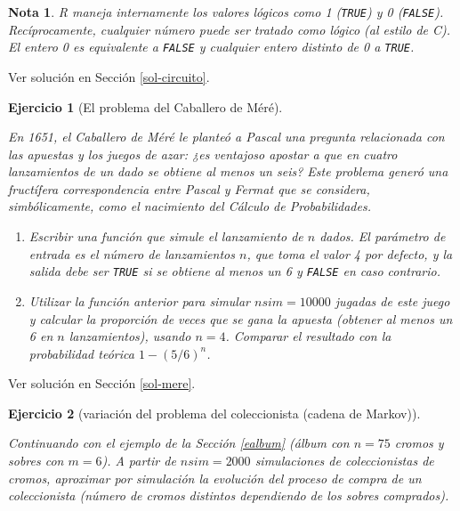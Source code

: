 \documentclass[
]{book}
\theoremstyle{break}
\newtheorem{exercise}{Ejercicio}[chapter]
\theoremstyle{nonumberplain}
\newtheorem{remark}{Nota}
\begin{document}
\begin{remark}
R maneja internamente los valores lógicos como 1 (\texttt{TRUE}) y 0 (\texttt{FALSE}).
Recíprocamente, cualquier número puede ser tratado como lógico (al estilo de C).
El entero 0 es equivalente a \texttt{FALSE} y cualquier entero distinto de 0 a \texttt{TRUE}.
\end{remark}

Ver solución en Sección \ref{sol-circuito}.

\begin{exercise}[El problema del Caballero de Méré]
\protect\hypertarget{exr:mere}{}\label{exr:mere}

En 1651, el Caballero de Méré le planteó a Pascal una pregunta
relacionada con las apuestas y los juegos de azar: ¿es ventajoso
apostar a que en cuatro lanzamientos de un dado se obtiene al menos
un seis? Este problema generó una fructífera correspondencia entre
Pascal y Fermat que se considera, simbólicamente, como el nacimiento
del Cálculo de Probabilidades.

\begin{enumerate}
\def\labelenumi{\alph{enumi})}
\item
  Escribir una función que simule el lanzamiento de \(n\) dados. El
  parámetro de entrada es el número de lanzamientos \(n\), que toma
  el valor 4 por defecto, y la salida debe ser \texttt{TRUE} si se
  obtiene al menos un 6 y \texttt{FALSE} en caso contrario.
\item
  Utilizar la función anterior para simular \(nsim=10000\) jugadas
  de este juego y calcular la proporción de veces que se gana la
  apuesta (obtener al menos un 6 en \(n\) lanzamientos), usando
  \(n=4\). Comparar el resultado con la probabilidad teórica
  \(1-(5/6)^{n}\).
\end{enumerate}

\end{exercise}

Ver solución en Sección \ref{sol-mere}.

\begin{exercise}[variación del problema del coleccionista (cadena de Markov)]
\protect\hypertarget{exr:album}{}\label{exr:album}

Continuando con el ejemplo de la Sección \ref{ealbum}
(álbum con \(n = 75\) cromos y sobres con \(m = 6\)). A partir de \(nsim=2000\) simulaciones de coleccionistas de cromos, aproximar por simulación la evolución del proceso de compra de un coleccionista (número de cromos distintos dependiendo de los sobres comprados).
\end{exercise}
\end{document}
